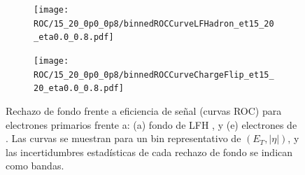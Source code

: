 \begin{figure}[h]
  \centering
  \begin{subfigure}[t]{0.5\linewidth}
    \centering
    \texttt{[image: ROC/15\_20\_0p0\_0p8/binnedROCCurveLFHadron\_et15\_20\_eta0.0\_0.8.pdf]}
    \caption{}
    \label{res:roc_pc}
  \end{subfigure}\hfill
  \begin{subfigure}[t]{0.5\linewidth}
    \centering
    \texttt{[image: ROC/15\_20\_0p0\_0p8/binnedROCCurveChargeFlip\_et15\_20\_eta0.0\_0.8.pdf]}
    \caption{}
    \label{res:roc_hf}
  \end{subfigure}

  \caption{Rechazo de fondo frente a eficiencia de señal (curvas ROC) para electrones primarios frente a:
  (a) fondo de LFH  ,
  y (e) electrones de .
  Las curvas se muestran para un bin representativo de $(E_{T}, |\eta|)$, y las incertidumbres estadísticas de cada rechazo de fondo se indican como bandas.}
  \label{res:roc_mainbkg}
\end{figure}

